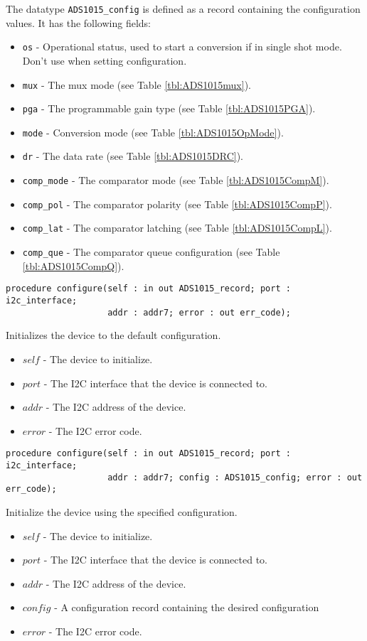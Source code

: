\documentclass[10pt, openany]{book}
\newcommand{\indextype}[1]{\index[type]{#1}}
\newcommand{\indexfunc}[1]{\index[func]{#1}}
\newcommand{\datatype}[1]{\texttt{#1}}
\begin{document}
The datatype \datatype{ADS1015\_config} is defined as a record containing the configuration values.  It has the following fields:
\begin{itemize}
    \item \datatype{os} - Operational status, used to start a conversion if in single shot mode.  Don't use when setting configuration.
    \item \datatype{mux} - The mux mode (see Table \ref{tbl:ADS1015mux}).
    \item \datatype{pga} - The programmable gain type (see Table \ref{tbl:ADS1015PGA}).
    \item \datatype{mode} - Conversion mode (see Table \ref{tbl:ADS1015OpMode}).
    \item \datatype{dr} - The data rate (see Table \ref{tbl:ADS1015DRC}).
    \item \datatype{comp\_mode} - The comparator mode (see Table \ref{tbl:ADS1015CompM}).
    \item \datatype{comp\_pol} - The comparator polarity (see Table \ref{tbl:ADS1015CompP}).
    \item \datatype{comp\_lat} - The comparator latching (see Table \ref{tbl:ADS1015CompL}).
    \item \datatype{comp\_que} - The comparator queue configuration  (see Table \ref{tbl:ADS1015CompQ}).
\end{itemize}
\indextype{ADS1015\_config}

\begin{lstlisting}
procedure configure(self : in out ADS1015_record; port : i2c_interface;
                    addr : addr7; error : out err_code);
\end{lstlisting}
Initializes the device to the default configuration.
\indexfunc{configure}
\begin{itemize}
  \item $self$ - The device to initialize.
  \item $port$ - The I2C interface that the device is connected to.
  \item $addr$ - The I2C address of the device.
  \item $error$ - The I2C error code.
\end{itemize}

\begin{lstlisting}
procedure configure(self : in out ADS1015_record; port : i2c_interface;
                    addr : addr7; config : ADS1015_config; error : out err_code);
\end{lstlisting}
\indexfunc{configure}
Initialize the device using the specified configuration.
\begin{itemize}
  \item $self$ - The device to initialize.
  \item $port$ - The I2C interface that the device is connected to.
  \item $addr$ - The I2C address of the device.
  \item $config$ - A configuration record containing the desired configuration
  \item $error$ - The I2C error code.
\end{itemize}
\end{document}
